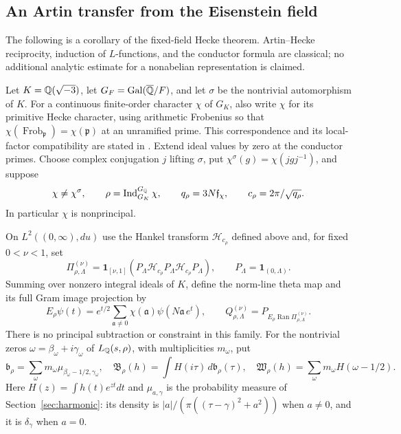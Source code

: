 \subsection{An Artin transfer from the Eisenstein field}
\label{sec:artin-induced-cutoff}
The following is a corollary of the fixed-field Hecke theorem.
Artin--Hecke reciprocity, induction of $L$-functions, and the
conductor formula are classical; no additional analytic estimate
for a nonabelian representation is claimed.

Let $K=\mathbb Q(\sqrt{-3})$, let $G_F=\operatorname{Gal}(\overline{\mathbb Q}/F)$,
and let $\sigma$ be the nontrivial automorphism of $K$.
For a continuous finite-order character $\chi$ of $G_K$, also
write $\chi$ for its primitive Hecke character, using arithmetic
Frobenius so that $\chi(\operatorname{Frob}_{\mathfrak p})
=\chi(\mathfrak p)$ at an unramified prime.
This correspondence and its local-factor compatibility are stated in
\citet[Theorems~4.2--4.3 and Proposition~4.4, pp.~52--53;
Proposition~5.2, p.~56]{horawaLfunctions}.
Extend ideal values by zero at the conductor primes.
Choose complex conjugation $j$ lifting $\sigma$, put
$\chi^\sigma(g)=\chi(jgj^{-1})$, and suppose
\[
 \chi\ne\chi^\sigma,\qquad
 \rho=\operatorname{Ind}_{G_K}^{G_\mathbb Q}\chi,\qquad
 q_\rho=3N\mathfrak f_\chi,\qquad c_\rho=2\pi/\sqrt{q_\rho}.
\]
In particular $\chi$ is nonprincipal.

On $L^2((0,\infty),du)$ use the Hankel transform
$\mathcal H_{c_\rho}$ defined above and, for fixed $0<\nu<1$, set
\[
 \Pi_{\rho,\Lambda}^{(\nu)}
  =\mathbf1_{[\nu,1]}
   (P_\Lambda\mathcal H_{c_\rho}P_\Lambda
                     \mathcal H_{c_\rho}P_\Lambda),
 \qquad P_\Lambda=\mathbf1_{(0,\Lambda)}.
\]
Summing over nonzero integral ideals of $K$, define the norm-line
theta map and its full Gram image projection by
\[
 E_\rho\psi(t)=e^{t/2}\sum_{\mathfrak a\ne0}
                     \chi(\mathfrak a)\psi(N\mathfrak a\,e^t),
 \qquad
 Q_{\rho,\Lambda}^{(\nu)}
     =P_{E_\rho\operatorname{Ran}\Pi_{\rho,\Lambda}^{(\nu)}}.
\]
There is no principal subtraction or constraint in this family.
For the nontrivial zeros $\omega=\beta_\omega+i\gamma_\omega$
of $L_\mathbb Q(s,\rho)$, with multiplicities $m_\omega$, put
\[
 \mathfrak b_\rho
   =\sum_\omega m_\omega\mu_{\beta_\omega-1/2,\gamma_\omega},
 \quad
 \mathfrak B_\rho(h)=\int H(i\tau)\,d\mathfrak b_\rho(\tau),
 \quad
 \mathfrak W_\rho(h)=\sum_\omega m_\omega H(\omega-1/2).
\]
Here $H(z)=\int h(t)e^{zt}dt$ and $\mu_{a,\gamma}$ is the
probability measure of Section~\ref{sec:harmonic}: its density is
$|a|/(\pi((\tau-\gamma)^2+a^2))$ when $a\ne0$, and it is
$\delta_\gamma$ when $a=0$.

